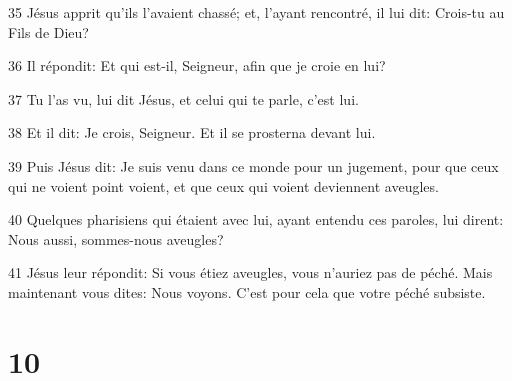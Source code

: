\par 35 Jésus apprit qu'ils l'avaient chassé; et, l'ayant rencontré, il lui dit: Crois-tu au Fils de Dieu?
\par 36 Il répondit: Et qui est-il, Seigneur, afin que je croie en lui?
\par 37 Tu l'as vu, lui dit Jésus, et celui qui te parle, c'est lui.
\par 38 Et il dit: Je crois, Seigneur. Et il se prosterna devant lui.
\par 39 Puis Jésus dit: Je suis venu dans ce monde pour un jugement, pour que ceux qui ne voient point voient, et que ceux qui voient deviennent aveugles.
\par 40 Quelques pharisiens qui étaient avec lui, ayant entendu ces paroles, lui dirent: Nous aussi, sommes-nous aveugles?
\par 41 Jésus leur répondit: Si vous étiez aveugles, vous n'auriez pas de péché. Mais maintenant vous dites: Nous voyons. C'est pour cela que votre péché subsiste.

\chapter{10}

